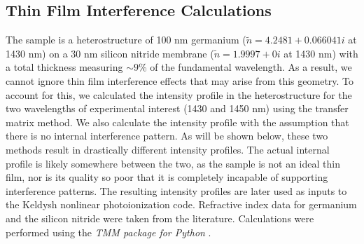 \subsection{Thin Film Interference Calculations}
\label{sec:thin_film_interference}

%	

The sample is a heterostructure of 100 nm germanium ($\tilde{n} = 4.2481 + 0.066041i$ at 1430 nm) on a 30 nm silicon nitride membrane ($\tilde{n}=1.9997 + 0i$ at 1430 nm) with a total thickness measuring $\sim 9$\% of the fundamental wavelength. As a result, we cannot ignore thin film interference effects that may arise from this geometry. To account for this, we calculated the intensity profile in the heterostructure for the two wavelengths of experimental interest (1430 and 1450 nm) using the transfer matrix method. We also calculate the intensity profile with the assumption that there is no internal interference pattern. As will be shown below, these two methods result in drastically different intensity profiles. The actual internal profile is likely somewhere between the two, as the sample is not an ideal thin film, nor is its quality so poor that it is completely incapable of supporting interference patterns. The resulting intensity profiles are later used as inputs to the Keldysh nonlinear photoionization code. Refractive index data for germanium \cite{nunleyOpticalConstantsGermanium2016} and the silicon nitride \cite{lukeBroadbandMidinfraredFrequency2015} were taken from the literature. Calculations were performed using the \textit{TMM package for Python} \cite{byrnesTmmSimulateLight2017,byrnesMultilayerOpticalCalculations2019}.

